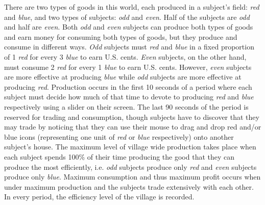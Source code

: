 \documentclass[graybox]{svmult}
\begin{document}
There are two types of goods in this world, each produced in a subject's field: {\it red} and {\it blue}, and two types of subjects: {\it odd} and {\it even}.  Half of the subjects are {\it odd} and half are {\it even}.  Both {\it odd} and {\it even} subjects can produce both types of goods and earn money for consuming both types of goods, but they produce and consume in different ways.  {\it Odd} subjects must {\it red} and {\it blue} in a fixed proportion of 1 {\it red} for every 3 {\it blue} to earn U.S. cents. {\it Even} subjects, on the other hand, must consume 2 {\it red} for every 1 {\it blue} to earn U.S. cents. However, {\it even} subjects are more effective at producing {\it blue} while {\it odd} subjects are more effective at producing {\it red}. Production occurs in the first 10 seconds of a period where each subject must decide how much of that time to devote to producing {\it red} and {\it blue} respectively using a slider on their screen. The last 90 seconds of the period is reserved for trading and consumption, though subjects have to discover that they may trade by noticing that they can use their mouse to drag and drop red and/or blue icons (representing one unit of {\it red} or {\it blue} respectively) onto another subject's house.  The maximum level of village wide production takes place when each subject spends 100\% of their time producing the good that they can produce the most efficiently, i.e. {\it odd} subjects produce only {\it red} and {\it even} subjects produce only {\it blue}.  Maximum consumption and thus maximum profit occurs when under maximum production and the subjects trade extensively with each other. In every period, the efficiency level of the village is recorded. 
\end{document}
